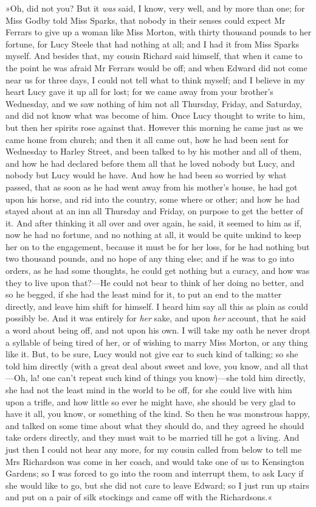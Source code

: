 »Oh, did not you? But it \textit{was} said, I know, very well, and by more than one; for Miss Godby told Miss Sparks, that nobody in their senses could expect Mr Ferrars to give up a woman like Miss Morton, with thirty thousand pounds to her fortune, for Lucy Steele that had nothing at all; and I had it from Miss Sparks myself. And besides that, my cousin Richard said himself, that when it came to the point he was afraid Mr Ferrars would be off; and when Edward did not come near us for three days, I could not tell what to think myself; and I believe in my heart Lucy gave it up all for lost; for we came away from your brother’s Wednesday, and we saw nothing of him not all Thursday, Friday, and Saturday, and did not know what was become of him. Once Lucy thought to write to him, but then her spirits rose against that. However this morning he came just as we came home from church; and then it all came out, how he had been sent for Wednesday to Harley Street, and been talked to by his mother and all of them, and how he had declared before them all that he loved nobody but Lucy, and nobody but Lucy would he have. And how he had been so worried by what passed, that as soon as he had went away from his mother’s house, he had got upon his horse, and rid into the country, some where or other; and how he had stayed about at an inn all Thursday and Friday, on purpose to get the better of it. And after thinking it all over and over again, he said, it seemed to him as if, now he had no fortune, and no nothing at all, it would be quite unkind to keep her on to the engagement, because it must be for her loss, for he had nothing but two thousand pounds, and no hope of any thing else; and if he was to go into orders, as he had some thoughts, he could get nothing but a curacy, and how was they to live upon that?—He could not bear to think of her doing no better, and so he begged, if she had the least mind for it, to put an end to the matter directly, and leave him shift for himself. I heard him say all this as plain as could possibly be. And it was entirely for \textit{her} sake, and upon \textit{her} account, that he said a word about being off, and not upon his own. I will take my oath he never dropt a syllable of being tired of her, or of wishing to marry Miss Morton, or any thing like it. But, to be sure, Lucy would not give ear to such kind of talking; so she told him directly (with a great deal about sweet and love, you know, and all that—Oh, la! one can’t repeat such kind of things you know)—she told him directly, she had not the least mind in the world to be off, for she could live with him upon a trifle, and how little so ever he might have, she should be very glad to have it all, you know, or something of the kind. So then he was monstrous happy, and talked on some time about what they should do, and they agreed he should take orders directly, and they must wait to be married till he got a living. And just then I could not hear any more, for my cousin called from below to tell me Mrs Richardson was come in her coach, and would take one of us to Kensington Gardens; so I was forced to go into the room and interrupt them, to ask Lucy if she would like to go, but she did not care to leave Edward; so I just run up stairs and put on a pair of silk stockings and came off with the Richardsons.«

